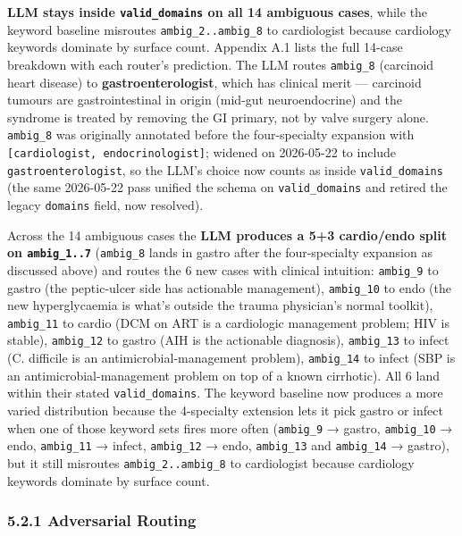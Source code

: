 \documentclass[
  american,
  a4paper,
]{article}
\begin{document}
\textbf{LLM stays inside \texttt{valid\_domains} on all 14 ambiguous
cases}, while the keyword baseline misroutes \texttt{ambig\_2..ambig\_8}
to cardiologist because cardiology keywords dominate by surface count.
Appendix A.1 lists the full 14-case breakdown with each router's
prediction. The LLM routes \texttt{ambig\_8} (carcinoid heart disease)
to \textbf{gastroenterologist}, which has clinical merit --- carcinoid
tumours are gastrointestinal in origin (mid-gut neuroendocrine) and the
syndrome is treated by removing the GI primary, not by valve surgery
alone. \texttt{ambig\_8} was originally annotated before the
four-specialty expansion with
\texttt{{[}cardiologist,\ endocrinologist{]}}; widened on 2026-05-22 to
include \texttt{gastroenterologist}, so the LLM's choice now counts as
inside \texttt{valid\_domains} (the same 2026-05-22 pass unified the
schema on \texttt{valid\_domains} and retired the legacy
\texttt{domains} field, now resolved).

Across the 14 ambiguous cases the \textbf{LLM produces a 5+3 cardio/endo
split on \texttt{ambig\_1..7}} (\texttt{ambig\_8} lands in gastro after
the four-specialty expansion as discussed above) and routes the 6 new
cases with clinical intuition: \texttt{ambig\_9} to gastro (the
peptic-ulcer side has actionable management), \texttt{ambig\_10} to endo
(the new hyperglycaemia is what's outside the trauma physician's normal
toolkit), \texttt{ambig\_11} to cardio (DCM on ART is a cardiologic
management problem; HIV is stable), \texttt{ambig\_12} to gastro (AIH is
the actionable diagnosis), \texttt{ambig\_13} to infect (C. difficile is
an antimicrobial-management problem), \texttt{ambig\_14} to infect (SBP
is an antimicrobial-management problem on top of a known cirrhotic). All
6 land within their stated \texttt{valid\_domains}. The keyword baseline
now produces a more varied distribution because the 4-specialty
extension lets it pick gastro or infect when one of those keyword sets
fires more often (\texttt{ambig\_9} → gastro, \texttt{ambig\_10} → endo,
\texttt{ambig\_11} → infect, \texttt{ambig\_12} → endo,
\texttt{ambig\_13} and \texttt{ambig\_14} → gastro), but it still
misroutes \texttt{ambig\_2..ambig\_8} to cardiologist because cardiology
keywords dominate by surface count.

\subsubsection{5.2.1 Adversarial Routing}\label{adversarial-routing}
\end{document}
